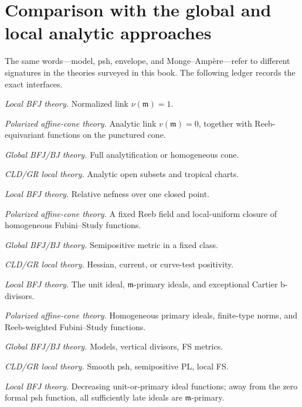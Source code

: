 \section{Comparison with the global and local analytic approaches}
\label{sec:local-comparison-ledger}

The same words---model, psh, envelope, and Monge--Amp\`ere---refer to
different signatures in the theories surveyed in this book.  The following
ledger records the exact interfaces.

\begin{description}[style=nextline,leftmargin=1.5em,labelindent=0pt,
                    itemsep=.75\baselineskip]
\item[Underlying space]
\emph{Local BFJ theory.} Normalized link $\nu(\mathfrak m)=1$.

\emph{Polarized affine-cone theory.} Analytic link
$v(\mathfrak m)=0$, together with Reeb-equivariant functions on the
punctured cone.

\emph{Global BFJ/BJ theory.} Full analytification or homogeneous cone.

\emph{CLD/GR local theory.} Analytic open subsets and tropical charts.

\item[Positivity datum]
\emph{Local BFJ theory.} Relative nefness over one closed point.

\emph{Polarized affine-cone theory.} A fixed Reeb field and local-uniform
closure of homogeneous Fubini--Study functions.

\emph{Global BFJ/BJ theory.} Semipositive metric in a fixed class.

\emph{CLD/GR local theory.} Hessian, current, or curve-test positivity.

\item[Model core]
\emph{Local BFJ theory.} The unit ideal, $\mathfrak m$-primary ideals,
and exceptional Cartier b-divisors.

\emph{Polarized affine-cone theory.} Homogeneous primary ideals, finite-type
norms, and Reeb-weighted Fubini--Study functions.

\emph{Global BFJ/BJ theory.} Models, vertical divisors, FS metrics.

\emph{CLD/GR local theory.} Smooth psh, semipositive PL, local FS.

\item[Approximation]
\emph{Local BFJ theory.} Decreasing unit-or-primary ideal functions; away
from the zero formal psh function, all sufficiently late ideals are
$\mathfrak m$-primary.


\end{description}
